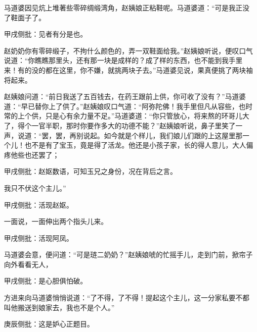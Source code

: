 \begin{parag}
    马道婆因见炕上堆著些零碎绸缎湾角，赵姨娘正粘鞋呢。马道婆道：“可是我正没了鞋面子了。\begin{note}甲戌侧批：见者有分是也。\end{note}赵奶奶你有零碎缎子，不拘什么颜色的，弄一双鞋面给我。”赵姨娘听说，便叹口气说道：“你瞧瞧那里头，还有那一块是成样的？成了样的东西，也不能到我手里来！有的没的都在这里，你不嫌，就挑两块子去。”马道婆见说，果真便挑了两块袖将起来。
\end{parag}


\begin{parag}
    赵姨娘问道：“前日我送了五百钱去，在药王跟前上供，你可收了没有？”马道婆道：“早已替你上了供了。”赵姨娘叹口气道：“阿弥陀佛！我手里但凡从容些，也时常的上个供，只是心有余力量不足。”马道婆道：“你只管放心，将来熬的环哥儿大了，得个一官半职，那时你要作多大的功德不能？”赵姨娘听说，鼻子里笑了一声，说道：“罢，罢，再别说起。如今就是个样儿，我们娘儿们跟的上这屋里那一个儿！也不是有了宝玉，竟是得了活龙。他还是小孩子家，长的得人意儿，大人偏疼他些也还罢了；\begin{note}甲戌侧批：赵妪数语，可知玉兄之身份，况在背后之言。\end{note}我只不伏这个主儿。”\begin{note}甲戌侧批：活现赵妪。\end{note}一面说，一面伸出两个指头儿来。\begin{note}甲戌侧批：活现阿凤。\end{note}马道婆会意，便问道：“可是琏二奶奶？”赵姨娘唬的忙摇手儿，走到门前，掀帘子向外看看无人，\begin{note}甲戌侧批：是心胆俱怕破。\end{note}方进来向马道婆悄悄说道：“了不得，了不得！提起这个主儿，这一分家私要不都叫他搬送到娘家去，我也不是个人。”\begin{note}庚辰侧批：这是妒心正题目。\end{note}
\end{parag}


